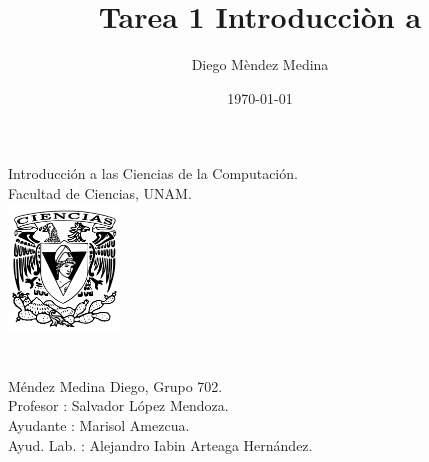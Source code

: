 \documentclass{article}
\title{Tarea 1 Introducciòn a \Latex }
\date {\today }
\author{Diego Mèndez Medina }
\begin{document}
   
\begin{center}
  
 
   {\fontsize{23}{0}\selectfont Introducción a las Ciencias de la Computación.}
  \\
  {\fontsize{23}{0}\selectfont Facultad de Ciencias, UNAM. }
  \\
  \includegraphics[width=3cm]{ciencias.png}\\
  \\
 {\fontsize{21}{0}\selectfont {}} 
 \\
 {\fontsize{20}{0}\selectfont 
  Méndez Medina Diego, Grupo 702.  \\    }
Profesor : 	Salvador López Mendoza. \\	
Ayudante :	Marisol Amezcua. \\
Ayud. Lab. : 	Alejandro Iabin Arteaga Hernández.	
\end{center}
\end{document}
